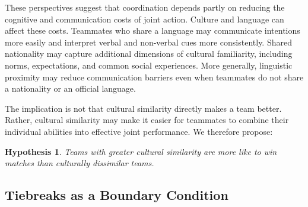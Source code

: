 \documentclass[10pt]{article}
\newtheorem{hypothesis}{Hypothesis}
\begin{document}
These perspectives suggest that coordination depends partly on reducing the cognitive and communication costs of joint action. Culture and language can affect these costs. Teammates who share a language may communicate intentions more easily and interpret verbal and non-verbal cues more consistently. Shared nationality may capture additional dimensions of cultural familiarity, including norms, expectations, and common social experiences. More generally, linguistic proximity may reduce communication barriers even when teammates do not share a nationality or an official language.

The implication is not that cultural similarity directly makes a team better. Rather, cultural similarity may make it easier for teammates to combine their individual abilities into effective joint performance. %
We therefore propose:
\begin{hypothesis}
 Teams with greater cultural similarity are more like to win matches  than culturally dissimilar teams.
\end{hypothesis}
\subsection{Tiebreaks as a Boundary Condition}

\end{document}
